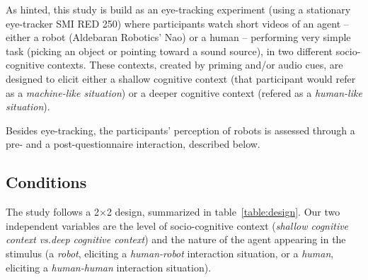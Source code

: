 \documentclass[lettersize, noapacite, twoside, HRI]{apa_HRI}
\newcommand{\vs}{\textit{vs.}\xspace}
\begin{document}
As hinted, this study is build as an eye-tracking experiment (using a stationary
eye-tracker SMI RED 250) where participants watch short videos of an agent --
either a robot (Aldebaran Robotics' Nao) or a human -- performing very simple
task (picking an object or pointing toward a sound source), in two different
socio-cognitive contexts.  These contexts, created by priming and/or audio cues,
are designed to elicit either a shallow cognitive context (that participant
would refer as a \emph{machine-like situation}) or a deeper cognitive context
(refered as a \emph{human-like situation}).

Besides eye-tracking, the participants' perception of robots is assessed through a
pre- and a post-questionnaire interaction, described below.

\subsection{Conditions}

The study follows a 2$\times$2 design, summarized in table~\ref{table:design}. Our two
independent variables are the level of socio-cognitive context (\emph{shallow
cognitive context} \vs \emph{deep cognitive context}) and the nature of the
agent appearing in the stimulus (a \emph{robot}, eliciting a \emph{human-robot} interaction
situation, or a \emph{human}, eliciting a \emph{human-human} interaction
situation).
\end{document}
